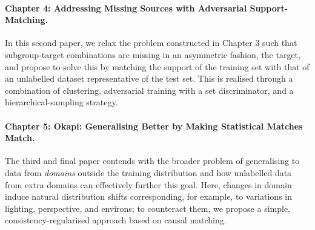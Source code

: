 \paragraph{Chapter 4: Addressing Missing Sources with Adversarial Support-Matching.}
%
In this second paper, we relax the problem constructed in Chapter 3 such that subgroup-target
combinations are missing in an asymmetric fashion, \wrt{} the target, and propose to solve this by
matching the support of the training set with that of an unlabelled dataset representative of the
test set. 
%
This is realised through a combination of clustering, adversarial training with a set
discriminator, and a hierarchical-sampling strategy.
%

\paragraph{Chapter 5: Okapi: Generalising Better by Making Statistical Matches Match.}
%
The third and final paper contends with the broader problem of generalising to data from
\emph{domains} outside the training distribution  and how unlabelled data from extra domains can
effectively further this goal.
%
Here, changes in domain induce natural distribution shifts corresponding, for example, to
variations in lighting, perspective, and environs; to counteract them, we propose a simple,
consistency-regularised approach based on causal matching.



    





%




